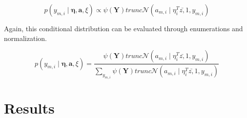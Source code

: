 \documentclass{article}
\begin{document}
\begin{equation}
p\left(y_{m,i}\mid\mathbf{\eta},\mathbf{a},\xi\right)\propto\psi\left(\mathbf{Y}\right)trunc\mathcal{N}\left(a_{m,i}\mid\eta_{i}^{T}\bar{z,}1,y_{m,i}\right)\end{equation}


Again, this conditional distribution can be evaluated through enumerations
and normalization.

\begin{equation}
p\left(y_{m,i}\mid\mathbf{\eta},\mathbf{a},\xi\right)=\frac{\psi\left(\mathbf{Y}\right)trunc\mathcal{N}\left(a_{m,i}\mid\eta_{i}^{T}\bar{z,}1,y_{m,i}\right)}{\sum_{y_{m,i}}\psi\left(\mathbf{Y}\right)trunc\mathcal{N}\left(a_{m,i}\mid\eta_{i}^{T}\bar{z,}1,y_{m,i}\right)}\end{equation}

\section{Results}




\end{document}
